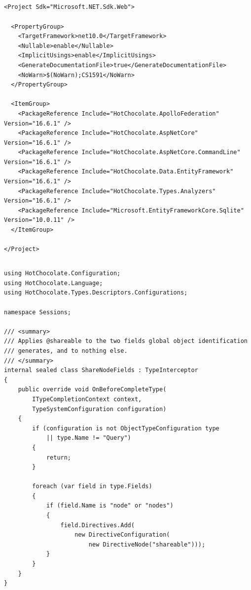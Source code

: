 \subsection*{}
\begin{verbatim}
<Project Sdk="Microsoft.NET.Sdk.Web">

  <PropertyGroup>
    <TargetFramework>net10.0</TargetFramework>
    <Nullable>enable</Nullable>
    <ImplicitUsings>enable</ImplicitUsings>
    <GenerateDocumentationFile>true</GenerateDocumentationFile>
    <NoWarn>$(NoWarn);CS1591</NoWarn>
  </PropertyGroup>

  <ItemGroup>
    <PackageReference Include="HotChocolate.ApolloFederation" Version="16.6.1" />
    <PackageReference Include="HotChocolate.AspNetCore" Version="16.6.1" />
    <PackageReference Include="HotChocolate.AspNetCore.CommandLine" Version="16.6.1" />
    <PackageReference Include="HotChocolate.Data.EntityFramework" Version="16.6.1" />
    <PackageReference Include="HotChocolate.Types.Analyzers" Version="16.6.1" />
    <PackageReference Include="Microsoft.EntityFrameworkCore.Sqlite" Version="10.0.11" />
  </ItemGroup>

</Project>
\end{verbatim}

\subsection*{}
\begin{verbatim}
using HotChocolate.Configuration;
using HotChocolate.Language;
using HotChocolate.Types.Descriptors.Configurations;

namespace Sessions;

/// <summary>
/// Applies @shareable to the two fields global object identification
/// generates, and to nothing else.
/// </summary>
internal sealed class ShareNodeFields : TypeInterceptor
{
    public override void OnBeforeCompleteType(
        ITypeCompletionContext context,
        TypeSystemConfiguration configuration)
    {
        if (configuration is not ObjectTypeConfiguration type
            || type.Name != "Query")
        {
            return;
        }

        foreach (var field in type.Fields)
        {
            if (field.Name is "node" or "nodes")
            {
                field.Directives.Add(
                    new DirectiveConfiguration(
                        new DirectiveNode("shareable")));
            }
        }
    }
}
\end{verbatim}

